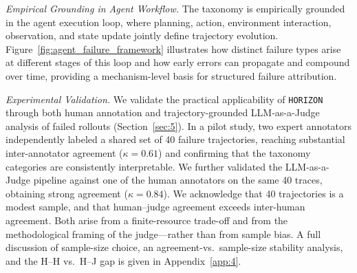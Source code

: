 \documentclass[11pt]{article}
\begin{document}
\textit{Empirical Grounding in Agent Workflow.}
The taxonomy is empirically grounded in the agent execution loop, where planning, action, environment interaction, observation, and state update jointly define trajectory evolution. Figure~\ref{fig:agent_failure_framework} illustrates how distinct failure types arise at different stages of this loop and how early errors can propagate and compound over time, providing a mechanism-level basis for structured failure attribution.

\textit{Experimental Validation.}
We validate the practical applicability of \texttt{HORIZON} through both human annotation and trajectory-grounded LLM-as-a-Judge analysis of failed rollouts (Section~\ref{sec:5}).
In a pilot study, two expert annotators independently labeled a shared set of 40 failure trajectories, reaching substantial inter-annotator agreement ($\kappa=0.61$) and confirming that the taxonomy categories are consistently interpretable.
We further validated the LLM-as-a-Judge pipeline against one of the human annotators on the same 40 traces, obtaining strong agreement ($\kappa=0.84$).
We acknowledge that 40 trajectories is a modest sample, and that human–judge agreement exceeds inter-human agreement. Both arise from a finite-resource trade-off and from the methodological framing of the judge—rather than from sample bias. A full discussion of sample-size choice, an agreement-vs.\ sample-size stability analysis, and the H--H vs.\ H--J gap is given in Appendix~\ref{app:4}.
\end{document}
